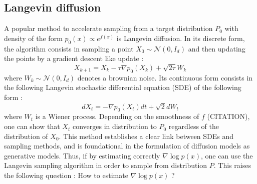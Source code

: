 \subsection{Langevin diffusion}
A popular method to accelerate sampling from a target distribution $P_{0}$ with density of the form $p_{0}(x) \propto e^{f(x)}$ is Langevin diffusion. In its discrete form, the algorithm consists in sampling a point $X_{0} \sim \mathcal{N}(0,I_{d})$ and then updating the points by a gradient descent like update : 
\begin{equation}\label{eq:langevin}
X_{k+1} = X_{k} - \tau \nabla p_{0}(X_{k}) + \sqrt{2\tau}W_{k}
\end{equation}
where $W_{k} \sim \mathcal{N}(0,I_{d}) $ denotes a brownian noise. Its continuous form consists in the following Langevin stochastic differential equation (SDE) of the following form : 
\begin{equation}
    dX_{t} = -\nabla p_{0}(X_{t})dt + \sqrt{2}dW_{t}
\end{equation}
where $W_{t}$ is a Wiener process. Depending on the smoothness of $f$ (CITATION), one can show that $X_{t}$ converges in distribution to $P_{0}$ regardless of the distribution of $X_{0}$. This method establishes a clear link between SDEs and sampling methods, and is foundational in the formulation of diffusion models as generative models.
Thus, if by estimating correctly $\nabla \log p(x)$, one can use the Langevin sampling algorithm in order to sample from distribution $P$. This raises the following question : How to estimate $\nabla \log p(x)$ ?
